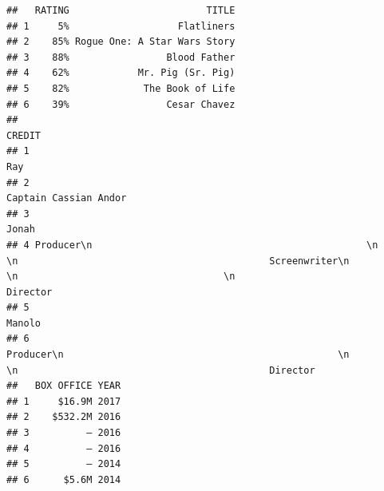\documentclass[12pt,]{book}
\theoremstyle{definition}
\theoremstyle{definition}
\theoremstyle{definition}
\theoremstyle{remark}
\begin{document}
\begin{verbatim}
##   RATING                        TITLE
## 1     5%                   Flatliners
## 2    85% Rogue One: A Star Wars Story
## 3    88%                 Blood Father
## 4    62%            Mr. Pig (Sr. Pig)
## 5    82%             The Book of Life
## 6    39%                 Cesar Chavez
##                                                                                                                                                                                                                                                                                                     CREDIT
## 1                                                                                                                                                                                                                                                                                                      Ray
## 2                                                                                                                                                                                                                                                                                    Captain Cassian Andor
## 3                                                                                                                                                                                                                                                                                                    Jonah
## 4 Producer\n                                                \n                                    \n                                            Screenwriter\n                                                \n                                    \n                                            Director
## 5                                                                                                                                                                                                                                                                                                   Manolo
## 6                                                                                                                                                   Producer\n                                                \n                                    \n                                            Director
##   BOX OFFICE YEAR
## 1     $16.9M 2017
## 2    $532.2M 2016
## 3          — 2016
## 4          — 2016
## 5          — 2014
## 6      $5.6M 2014
\end{verbatim}
\end{document}

